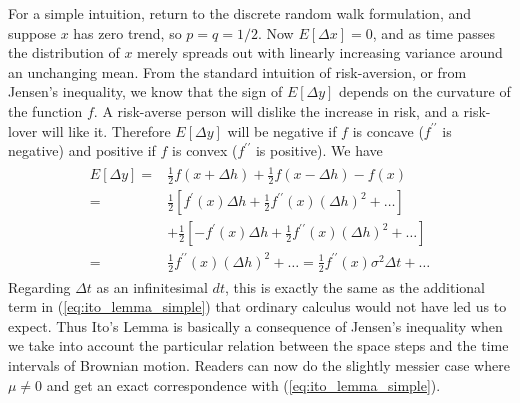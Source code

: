 \documentclass[\topdir/lecture\_notes.tex]{subfiles}
\begin{document}
For a simple intuition, return to the discrete random walk formulation, and suppose $x$ has zero trend, so $p=q=1 / 2$. Now $E[\Delta x]=0$,
and as time passes the distribution of $x$ merely spreads out with linearly increasing variance around an unchanging mean. From the standard intuition of risk-aversion, or from Jensen's inequality, we know that the sign of $E[\Delta y]$ depends on the curvature of the function $f$. A risk-averse person will dislike the increase in risk, and a risk-lover will like it. Therefore $E[\Delta y]$ will be negative if $f$ is concave ($f^{\prime \prime}$ is negative) and positive if $f$ is convex ($f^{\prime \prime}$ is positive). We have
\begin{align*}
\begin{aligned}
E[\Delta y]= & \frac{1}{2} f(x+\Delta h)+\frac{1}{2} f(x-\Delta h)-f(x) \\
= & \frac{1}{2}\left[f^{\prime}(x) \Delta h+\frac{1}{2} f^{\prime \prime}(x)(\Delta h)^{2}+\ldots\right] \\
& +\frac{1}{2}\left[-f^{\prime}(x) \Delta h+\frac{1}{2} f^{\prime \prime}(x)(\Delta h)^{2}+\ldots\right] \\
= & \frac{1}{2} f^{\prime \prime}(x)(\Delta h)^{2}+\ldots=\frac{1}{2} f^{\prime \prime}(x) \sigma^{2} \Delta t+\ldots
\end{aligned}
\end{align*}
Regarding $\Delta t$ as an infinitesimal $dt$, this is exactly the same as the additional term in (\ref{eq:ito_lemma_simple}) that ordinary calculus would not have led us to expect. Thus Ito's Lemma is basically a consequence of Jensen's inequality when we take into account the particular relation between the space steps and the time intervals of Brownian motion. Readers can now do the slightly messier case where $\mu \neq 0$ and get an exact correspondence with (\ref{eq:ito_lemma_simple}).
\end{document}
